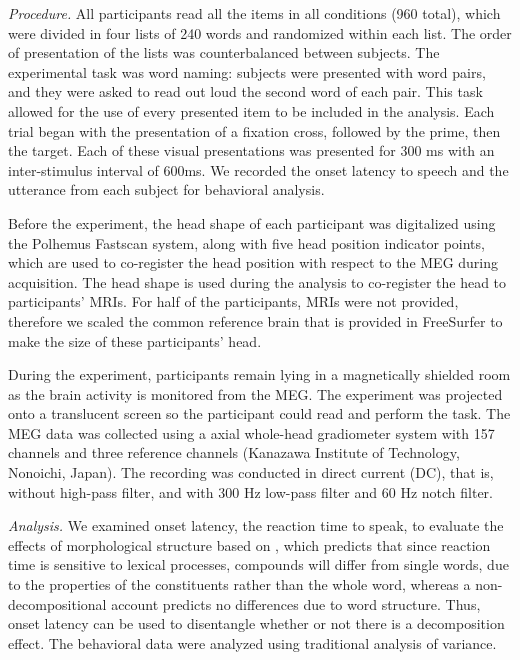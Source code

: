\documentclass{frontiersSCNS}
\begin{document}
\textit{Procedure.} All participants read all the items in all conditions (960 total), which were divided in four lists of 240 words and randomized within each list.  The order of presentation of the lists was counterbalanced between subjects.  The experimental task was word naming: subjects were presented with word pairs, and they were asked to read out loud the second word of each pair.  This task allowed for the use of every presented item to be included in the analysis. Each trial began with the presentation of a fixation cross, followed by the prime, then the target. Each of these visual presentations was presented for 300 ms with an inter-stimulus interval of 600ms. We recorded the onset latency to speech and the utterance from each subject for behavioral analysis.

Before the experiment, the head shape of each participant was digitalized using the Polhemus Fastscan system, along with five head position indicator points, which are used to co-register the head position with respect to the MEG during acquisition.  The head shape is used during the analysis to co-register the head to participants’ MRIs. For half of the participants, MRIs were not provided, therefore we scaled the common reference brain that is provided in FreeSurfer to make the size of these participants’ head.

	During the experiment, participants remain lying in a magnetically shielded room as the brain activity is monitored from the MEG. The experiment was projected onto a translucent screen so the participant could read and perform the task. The MEG data was collected using a axial whole-head gradiometer system with 157 channels and three reference channels (Kanazawa Institute of Technology, Nonoichi, Japan).  The recording was conducted in direct current (DC), that is, without high-pass filter, and with 300 Hz low-pass filter and 60 Hz notch filter.

\textit{Analysis.} We examined onset latency, the reaction time to speak, to evaluate the effects of morphological structure based on \citep{Fiorentino:2007}, which predicts that since reaction time is sensitive to lexical processes, compounds will differ from single words, due to the properties of the constituents rather than the whole word, whereas a non-decompositional account predicts no differences due to word structure. Thus, onset latency can be used to disentangle whether or not there is a decomposition effect. The behavioral data were analyzed using traditional analysis of variance.
\end{document}
